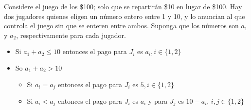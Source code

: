 \documentclass{homework}
\begin{document}
\question Considere el juego de los \$100; solo que se repartirán \$10 en lugar de \$100. Hay dos
jugadores quienes eligen un número entero entre 1 y 10, y lo anuncian al que controla el juego sin
que se enteren entre ambos. Suponga que los números son $a_1$ y $a_2$, respectivamente para cada jugador.
 \begin{itemize}
     \item Si $a_1+a_2 \leq 10$ entonces el pago para $J_i$ es $a_i,i \in  \{1,2\}$ 
     \item So $a_1+a_2 >10$
        \begin{itemize}
            \item Si $a_i=a_j$ entonces el pago para $J_i$ es $5, i\in\{1,2\}$
            \item Si $a_i<a_j$ entonces el pago para $J_i$ es $a_i$ y para $J_j$ es $10-a_i$, $i,j\in \{1,2\}$
        \end{itemize}   
 \end{itemize}
\end{document}
